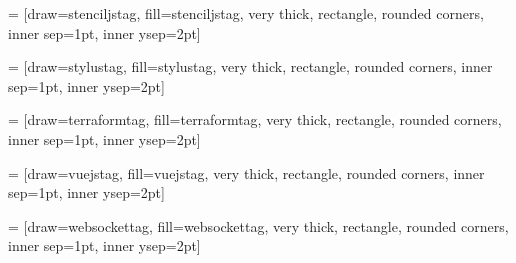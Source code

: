 = [draw=stenciljstag, fill=stenciljstag, very thick, rectangle, rounded corners, inner sep=1pt, inner ysep=2pt]
\newcommand{\stenciljstag}{\begin{tikzpicture}\node [stenciljstag] (box){{\scriptsize \textbf{\phantom{|}StencilJS\phantom{|}}}};\end{tikzpicture}}
\usepackage{tikz}
    
 = [draw=stylustag, fill=stylustag, very thick, rectangle, rounded corners, inner sep=1pt, inner ysep=2pt]
\newcommand{\stylustag}{\begin{tikzpicture}\node [stylustag] (box){{\scriptsize \textbf{\phantom{|}Stylus\phantom{|}}}};\end{tikzpicture}}
\usepackage{tikz}
    
 = [draw=terraformtag, fill=terraformtag, very thick, rectangle, rounded corners, inner sep=1pt, inner ysep=2pt]
\newcommand{\terraformtag}{\begin{tikzpicture}\node [terraformtag] (box){{\scriptsize \color{white}{\textbf{\phantom{|}Terraform\phantom{|}}}}};\end{tikzpicture}}
\usepackage{tikz}
    
 = [draw=vuejstag, fill=vuejstag, very thick, rectangle, rounded corners, inner sep=1pt, inner ysep=2pt]
\newcommand{\vuejstag}{\begin{tikzpicture}\node [vuejstag] (box){{\scriptsize \color{white}{\textbf{\phantom{|}Vue.js\phantom{|}}}}};\end{tikzpicture}}
\usepackage{tikz}
    
 = [draw=websockettag, fill=websockettag, very thick, rectangle, rounded corners, inner sep=1pt, inner ysep=2pt]
\newcommand{\websockettag}{\begin{tikzpicture}\node [websockettag] (box){{\scriptsize \textbf{\phantom{|}WebSocket\phantom{|}}}};\end{tikzpicture}}
